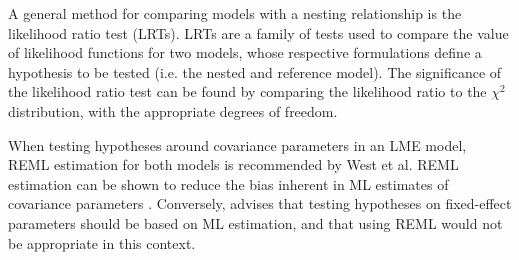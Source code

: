 \documentclass[Chap4main.tex]{subfiles}
\begin{document}
A general method for comparing models with a nesting relationship is the likelihood ratio test (LRTs). LRTs are a family of tests used to compare the value of likelihood functions for two models, whose respective formulations define a hypothesis to be tested (i.e. the nested and reference model). The significance of the likelihood ratio test can be found by comparing the likelihood ratio to the $\chi^2$ distribution, with the appropriate degrees of freedom.

When testing hypotheses around covariance parameters in an LME model, REML estimation for both models is recommended by West et al. REML estimation can be shown to reduce the bias inherent in ML estimates of covariance parameters \citep{west}. Conversely, \citet{pb} advises that testing hypotheses on fixed-effect parameters should be based on ML estimation, and that using REML would not be appropriate in this context.




\newpage

\end{document}
